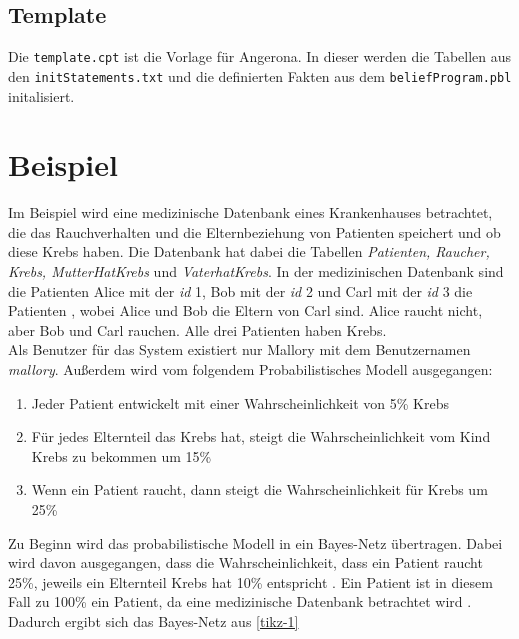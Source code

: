 \documentclass[german,version-2020-11]{uzl-thesis}
\begin{document}
\subsection{Template}
Die \texttt{template.cpt} ist die Vorlage für Angerona. In dieser werden die Tabellen aus den \texttt{initStatements.txt} und die definierten Fakten aus dem \texttt{beliefProgram.pbl} initalisiert.
\section{Beispiel} \label{chap:Beispiel}
Im Beispiel wird  eine medizinische Datenbank eines Krankenhauses betrachtet, die das Rauchverhalten und die Elternbeziehung von Patienten speichert und ob diese Krebs haben. Die Datenbank hat dabei die Tabellen \textit{Patienten, Raucher, Krebs, MutterHatKrebs } und \textit{VaterhatKrebs}. In der medizinischen Datenbank sind die Patienten Alice mit der \textit{id} 1, Bob mit der \textit{id} 2 und Carl mit der \textit{id} 3 die Patienten , wobei Alice und Bob die Eltern von Carl sind. Alice raucht nicht, aber Bob und Carl rauchen. Alle drei Patienten haben Krebs.\\  Als Benutzer für das System existiert nur Mallory mit dem Benutzernamen \textit{mallory}. Außerdem wird vom folgendem Probabilistisches Modell ausgegangen: 
\begin{enumerate}
\item Jeder Patient entwickelt mit einer Wahrscheinlichkeit von 5\% Krebs
\item Für jedes Elternteil das Krebs hat, steigt die Wahrscheinlichkeit vom Kind Krebs zu bekommen um 15\%
\item Wenn ein Patient raucht, dann steigt die Wahrscheinlichkeit für Krebs um 25\%
\end{enumerate}
Zu Beginn  wird das probabilistische Modell in ein Bayes-Netz übertragen. Dabei wird davon ausgegangen, dass die Wahrscheinlichkeit, dass ein Patient raucht 25\%, jeweils ein Elternteil Krebs hat 10\% entspricht \cite{11}. Ein Patient ist in diesem Fall zu 100\% ein Patient, da eine medizinische Datenbank betrachtet wird \cite{guarnieri2017securing}. Dadurch ergibt sich das Bayes-Netz aus \autoref{tikz-1} \\
\end{document}
